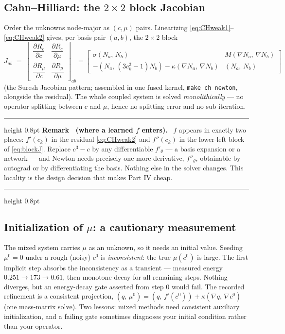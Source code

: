 \documentclass[11pt]{article}
\newcounter{remark}
\newenvironment{remark}[1]{%
  \refstepcounter{remark}\par\medskip
  \noindent\begin{minipage}{\linewidth}
  \hrule height 0.8pt \smallskip
  \textbf{Remark \theremark\ (#1).}\ }{%
  \smallskip\hrule height 0.8pt \end{minipage}\par\medskip}
\newcommand{\ip}[2]{\left(#1,\,#2\right)}
\begin{document}
\subsection{Cahn--Hilliard: the $2\times 2$ block Jacobian}

Order the unknowns node-major as $(c,\mu)$ pairs. Linearizing
\eqref{eq:CHweak1}--\eqref{eq:CHweak2} gives, per basis pair $(a,b)$,
the $2\times2$ block
\begin{equation}
  J_{ab} \;=\;
  \begin{bmatrix}
    \dfrac{\partial R_c}{\partial c} & \dfrac{\partial R_c}{\partial \mu}\\[1.2em]
    \dfrac{\partial R_\mu}{\partial c} & \dfrac{\partial R_\mu}{\partial \mu}
  \end{bmatrix}_{ab}
  =
  \begin{bmatrix}
    \sigma \ip{N_a}{N_b} & M \ip{\nabla N_a}{\nabla N_b}\\[0.6em]
    -\ip{N_a}{(3c_k^2-1) N_b} - \kappa \ip{\nabla N_a}{\nabla N_b}
      & \ip{N_a}{N_b}
  \end{bmatrix}
  \label{eq:blockJ}
\end{equation}
(the Suresh Jacobian pattern; assembled in one fused kernel,
\texttt{make\_ch\_newton}, alongside the residual). The whole coupled
system is solved \emph{monolithically} --- no operator splitting
between $c$ and $\mu$, hence no splitting error and no sub-iteration.

\begin{remark}{where a learned $f$ enters}
$f$ appears in exactly two places: $f'(c_k)$ in the residual
\eqref{eq:CHweak2} and $f''(c_k)$ in the lower-left block of
\eqref{eq:blockJ}. Replace $c^3 - c$ by any differentiable
$f'_\theta$ --- a basis expansion or a network --- and Newton needs
precisely one more derivative, $f''_\theta$, obtainable by autograd or
by differentiating the basis. Nothing else in the solver changes. This
locality is the design decision that makes Part IV cheap.
\end{remark}

\subsection{Initialization of $\mu$: a cautionary measurement}

The mixed system carries $\mu$ as an unknown, so it needs an initial
value. Seeding $\mu^0 = 0$ under a rough (noisy) $c^0$ is
\emph{inconsistent}: the true $\mu(c^0)$ is large. The first implicit
step absorbs the inconsistency as a transient --- measured energy
$0.251 \to 173 \to 0.61$, then monotone decay for all remaining steps.
Nothing diverges, but an energy-decay gate asserted from step 0 would
fail. The recorded refinement is a consistent projection,
$\ip{q}{\mu^0} = \ip{q}{f'(c^0)} + \kappa\ip{\nabla q}{\nabla c^0}$
(one mass-matrix solve). Two lessons: mixed methods need consistent
auxiliary initialization, and a failing gate sometimes diagnoses your
initial condition rather than your operator.
\end{document}
